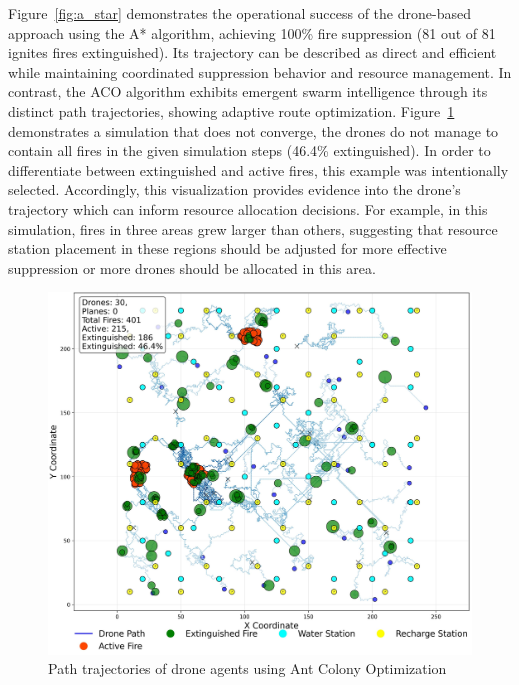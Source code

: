 \documentclass[11pt, a4paper]{article}
\begin{document}
Figure~\ref{fig:a_star} demonstrates the operational success of the drone-based approach using the A* algorithm, achieving 100\% fire suppression (81 out of 81 ignites fires extinguished). Its trajectory can be described as direct and efficient while maintaining coordinated suppression behavior and resource management. In contrast, the ACO algorithm exhibits emergent swarm intelligence through its distinct path trajectories, showing adaptive route optimization. Figure~\ref{fig:aco} demonstrates a simulation that does not converge, the drones do not manage to contain all fires in the given simulation steps (46.4\% extinguished). In order to differentiate between extinguished and active fires, this example was intentionally selected. Accordingly, this visualization provides evidence into the drone's trajectory which can inform resource allocation decisions. For example, in this simulation, fires in three areas grew larger than others, suggesting that resource station placement in these regions should be adjusted for more effective suppression or more drones should be allocated in this area. 

\begin{figure}[htbp]
    \centering
    \includegraphics[width=1\linewidth]{figures/ACO_agent_paths.jpeg}
    \caption{Path trajectories of drone agents using Ant Colony Optimization}
    \label{fig:aco}
\end{figure}
\end{document}
